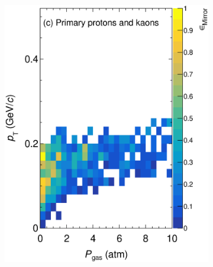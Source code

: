 \begin{figure}[!ht]
\begin{subfigure}[b]{0.32\textwidth}
         \includegraphics[width=\textwidth]{figures/ch5-KF_NDGAr/ToySample/ParScan/testTPCMirrorMirrorRatioVSpTVSdens_kp.eps}
         \caption{}
         \label{fig:MirrorRation_Prim_k}
     \end{subfigure}
     \begin{subfigure}[b]{0.32\textwidth}
         \centering

\end{subfigure}
\end{figure}
